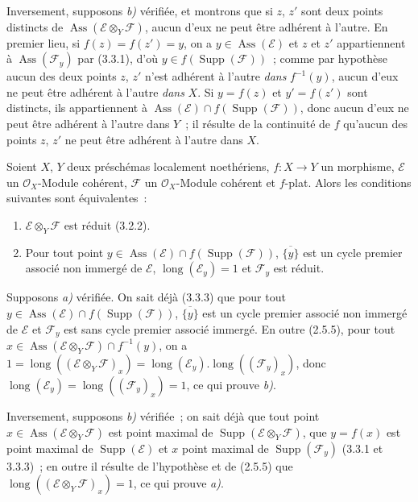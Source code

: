 Inversement, supposons \emph{b)} vérifiée, et montrons que si $z$, $z'$ sont
deux points distincts de $\operatorname{Ass}(\mathcal E\otimes_Y\mathcal F)$,
aucun d'eux ne peut être adhérent à l'autre. En premier lieu, si
$f(z)=f(z')=y$, on a $y\in\operatorname{Ass}(\mathcal E)$ et $z$ et $z'$
appartiennent à $\operatorname{Ass}(\mathcal F_y)$ par (3.3.1), d'où
$y\in f(\operatorname{Supp}(\mathcal F))$~; comme par hypothèse aucun des deux
points $z$, $z'$ n'est adhérent à l'autre \emph{dans} $f^{-1}(y)$, aucun d'eux
ne peut être adhérent à l'autre \emph{dans} $X$. Si $y=f(z)$ et $y'=f(z')$ sont
distincts, ils appartiennent à
$\operatorname{Ass}(\mathcal E)\cap f(\operatorname{Supp}(\mathcal F))$, donc
aucun d'eux ne peut être adhérent à l'autre dans $Y$~; il résulte de la
continuité de $f$ qu'aucun des points $z$, $z'$ ne peut être adhérent à
l'autre dans $X$.

\begin{proposition}[3.3.4]
\label{IV.2.3.3.4-fr}
Soient $X$, $Y$ deux préschémas localement noethériens, $f:X\to Y$ un
morphisme, $\mathcal E$ un $\mathcal O_X$-Module cohérent, $\mathcal F$ un
$\mathcal O_X$-Module cohérent et $f$-plat. Alors les conditions suivantes
sont équivalentes~:
\begin{enumerate}
\item[\emph{a)}] $\mathcal E\otimes_Y\mathcal F$ est réduit \textup{(3.2.2)}.
\item[\emph{b)}] Pour tout point
$y\in\operatorname{Ass}(\mathcal E)\cap f(\operatorname{Supp}(\mathcal F))$,
$\overline{\{y\}}$ est un cycle premier associé non immergé de $\mathcal E$,
$\operatorname{long}(\mathcal E_y)=1$ et $\mathcal F_y$ est réduit.
\end{enumerate}
\end{proposition}

Supposons \emph{a)} vérifiée. On sait déjà (3.3.3) que pour tout
$y\in\operatorname{Ass}(\mathcal E)\cap f(\operatorname{Supp}(\mathcal F))$,
$\overline{\{y\}}$ est un cycle premier associé non immergé de $\mathcal E$ et
$\mathcal F_y$ est sans cycle premier associé immergé. En outre (2.5.5), pour
tout $x\in\operatorname{Ass}(\mathcal E\otimes_Y\mathcal F)\cap f^{-1}(y)$,
on a
$1=\operatorname{long}((\mathcal E\otimes_Y\mathcal F)_x)
=\operatorname{long}(\mathcal E_y).\operatorname{long}((\mathcal F_y)_x)$,
donc $\operatorname{long}(\mathcal E_y)
=\operatorname{long}((\mathcal F_y)_x)=1$, ce qui prouve \emph{b)}.

Inversement, supposons \emph{b)} vérifiée~; on sait déjà que tout point
$x\in\operatorname{Ass}(\mathcal E\otimes_Y\mathcal F)$ est point maximal de
$\operatorname{Supp}(\mathcal E\otimes_Y\mathcal F)$, que $y=f(x)$ est point
maximal de $\operatorname{Supp}(\mathcal E)$ et $x$ point maximal de
$\operatorname{Supp}(\mathcal F_y)$ (3.3.1 et 3.3.3)~; en outre il résulte de
l'hypothèse et de (2.5.5) que
$\operatorname{long}((\mathcal E\otimes_Y\mathcal F)_x)=1$, ce qui prouve
\emph{a)}.

